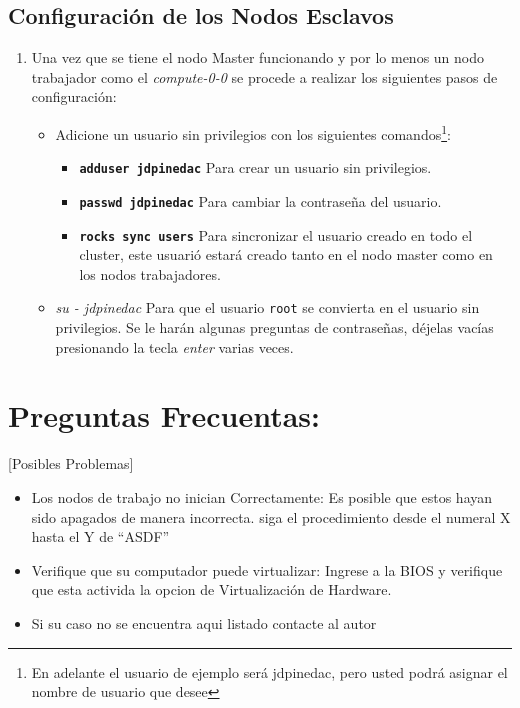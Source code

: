 \subsection{Configuración de los Nodos Esclavos}

\begin{enumerate}
	\item Una vez que se tiene el nodo Master funcionando y por lo menos un nodo trabajador como el \textit{compute-0-0} se procede a realizar los siguientes pasos de configuración:

	\begin{itemize}
	\item Adicione un usuario sin privilegios con los siguientes comandos\footnote{En adelante el usuario de ejemplo será jdpinedac, pero usted podrá asignar el nombre de usuario que desee}:

	\begin{itemize}
		\item \textbf{\texttt{adduser jdpinedac}} Para crear un usuario sin privilegios.

		\item \textbf{\texttt{passwd jdpinedac}} Para cambiar la contraseña del usuario.

		\item \textbf{\texttt{rocks sync users}} Para sincronizar el usuario creado en todo el cluster, este usuarió estará creado tanto en el nodo master como en los nodos trabajadores.
	\end{itemize}

	\item \textit{su - jdpinedac} Para que el usuario \texttt{root} se convierta en el usuario sin privilegios. Se le harán algunas preguntas de contraseñas, déjelas vacías presionando la tecla \textit{enter} varias veces.
	\end{itemize}
	
\end{enumerate}


\section{Preguntas Frecuentas:}[Posibles Problemas]

\begin{itemize}
	\item Los nodos de trabajo no inician Correctamente: Es posible que estos hayan sido apagados de manera incorrecta. 
	siga el procedimiento desde el numeral X hasta el Y de ``ASDF''

	\item Verifique que su computador puede virtualizar: Ingrese a la BIOS y verifique que esta activida la opcion de Virtualización de Hardware. 

	\item Si su caso no se encuentra aqui listado contacte al autor
\end{itemize}
